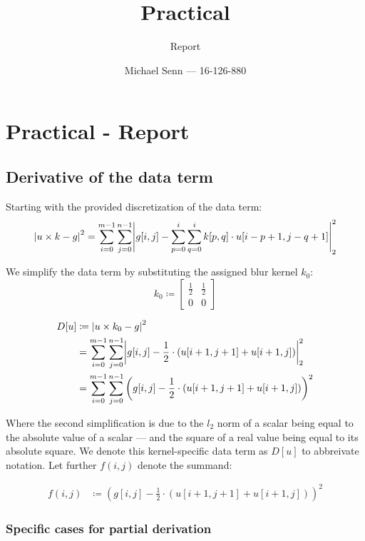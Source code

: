 \documentclass[a4paper]{scrreprt}
\title{Practical \series}
\subtitle{Report}
\author{Michael Senn \maillink{michael.senn@students.unibe.ch} --- 16-126-880}
\date{\printdate}
\DeclarePairedDelimiter\abs{\lvert}{\rvert}
\newcommand{\series}{01}
\begin{document}
\maketitle


\setcounter{chapter}{\numexpr \series - 1 \relax}

\chapter{Practical - Report}

\section{Derivative of the data term}

Starting with the provided discretization of the data term:
\[
		\abs*{u \times k - g}^2 = \sum_{i=0}^{m-1} \sum_{j=0}^{n-1} \abs*{g[i, j] - \sum_{p=0}^{i} \sum_{q=0}^{i} k[p, q] \cdot u[i - p + 1, j - q + 1]}_2^2
\]

We simplify the data term by substituting the assigned blur kernel $k_0$:
\[
		k_0 \coloneqq \begin{bmatrix}
				\frac{1}{2} & \frac{1}{2} \\
				0 & 0
		\end{bmatrix}
\]

\begin{align*}
		D[u] & \coloneqq \abs*{u \times k_0 - g}^2 \\ 
			 & = \sum_{i=0}^{m-1} \sum_{j=0}^{n-1} \abs*{g[i, j] - \frac{1}{2} \cdot (u[i + 1, j + 1] + u[i + 1, j])}_2^2 \\
			 & = \sum_{i=0}^{m-1} \sum_{j=0}^{n-1} \left(g[i, j] - \frac{1}{2} \cdot (u[i + 1, j + 1] + u[i + 1, j])\right)^2
\end{align*}

Where the second simplification is due to the $l_2$ norm of a scalar being
equal to the absolute value of a scalar --- and the square of a real value
being equal to its absolute square. We denote this kernel-specific data term as
$D[u]$ to abbreivate notation. Let further $f(i, j)$ denote the summand:

\begin{align*}
		f(i, j) & \coloneqq \left(g[i, j] - \frac{1}{2} \cdot (u[i + 1, j + 1] + u[i + 1, j])\right)^2
\end{align*}

\subsection{Specific cases for partial derivation}
\end{document}
